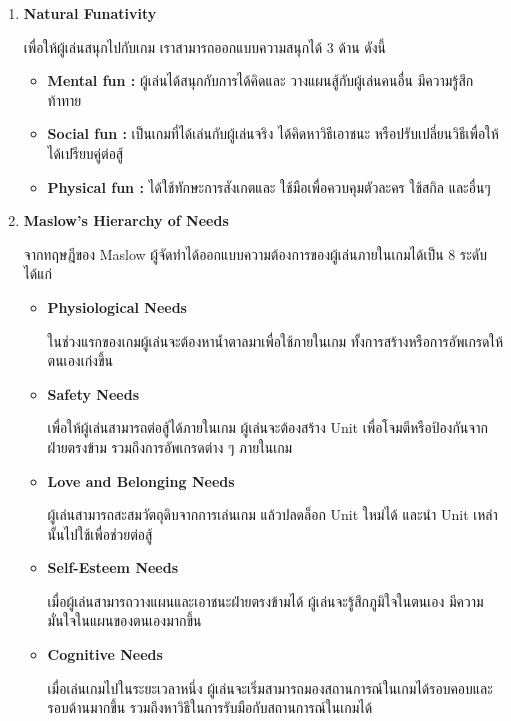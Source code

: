 \documentclass[12pt,oneside,openright,a4paper]{cpe-thai-project}
\begin{document}
\begin{enumerate}
  \item \textbf{Natural Funativity} 
  
  เพื่อให้ผู้เล่นสนุกไปกับเกม เราสามารถออกแบบความสนุกได้ 3 ด้าน ดังนี้
  
  \begin{itemize}
    \item \textbf{Mental fun :} ผู้เล่นได้สนุกกับการได้คิดและ
    วางแผนสู้กับผู้เล่นคนอื่น มีความรู้สึกท้าทาย
    \item \textbf{Social fun :} เป็นเกมที่ได้เล่นกับผู้เล่นจริง 
    ได้คิดหาวิธีเอาชนะ หรือปรับเปลี่ยนวิธีเพื่อให้ได้เปรียบคู่ต่อสู้
    \item \textbf{Physical fun :} ได้ใช้ทักษะการสังเกตและ
    ใช้มือเพื่อควบคุมตัวละคร ใช้สกิล และอื่นๆ
  \end{itemize}


  \item \textbf{Maslow’s Hierarchy of Needs}
  
  จากทฤษฎีของ Maslow ผู้จัดทำได้ออกแบบความต้องการของผู้เล่นภายในเกมได้เป็น 8 ระดับ ได้แก่

  \begin{itemize}
    \item \textbf{Physiological Needs} 
    
    ในช่วงแรกของเกมผู้เล่นจะต้องหาน้ำตาลมาเพื่อใช้ภายในเกม ทั้งการสร้างหรือการอัพเกรดให้ตนเองเก่งขึ้น

    \item \textbf{Safety Needs} 
    
    เพื่อให้ผู้เล่นสามารถต่อสู้ได้ภายในเกม ผู้เล่นจะต้องสร้าง Unit เพื่อโจมตีหรือป้องกันจากฝ่ายตรงข้าม รวมถึงการอัพเกรดต่าง ๆ ภายในเกม
    
    \item \textbf{Love and Belonging Needs} 
    
    ผู้เล่นสามารถสะสมวัตถุดิบจากการเล่นเกม แล้วปลดล็อก Unit ใหม่ได้ และนำ Unit เหล่านั้นไปใช้เพื่อช่วยต่อสู้
    
    \item \textbf{Self-Esteem Needs} 
    
    เมื่อผู้เล่นสามารถวางแผนและเอาชนะฝ่ายตรงข้ามได้ ผู้เล่นจะรู้สึกภูมิใจในตนเอง มีความมั่นใจในแผนของตนเองมากขึ้น
    
    \item \textbf{Cognitive Needs} 
    
    เมื่อเล่นเกมไปในระยะเวลาหนึ่ง ผู้เล่นจะเริ่มสามารถมองสถานการณ์ในเกมได้รอบคอบและรอบด้านมากขึ้น รวมถึงหาวิธีในการรับมือกับสถานการณ์ในเกมได้
    

\end{itemize}
\end{enumerate}
\end{document}
